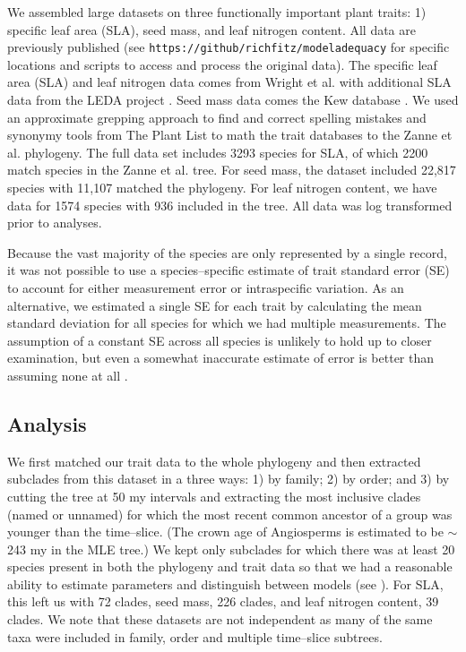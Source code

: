 \documentclass[a4paper,12pt]{article}
\begin{document}
We assembled large datasets on three functionally important plant traits: 1) specific leaf area (SLA), seed mass, and leaf nitrogen content. All data are previously published (see \texttt{https://github/richfitz/modeladequacy} for specific locations and scripts to access and process the original data). The specific leaf area (SLA) and leaf nitrogen data comes from Wright et al. \citep{Wright2004} with additional SLA data from the LEDA project \citep{Kleyer2008}. Seed mass data comes the Kew database \citep{Kew2008}. We used an approximate grepping approach to find and correct spelling mistakes and synonymy tools from The Plant List \citep{plantlist} to math the trait databases to the Zanne et al. phylogeny. 
The full data set includes 3293 species for SLA, of which 2200 match species in the Zanne et al. tree. For seed mass, the dataset included 22,817 species with 11,107 matched the phylogeny. For leaf nitrogen content, we have data for 1574 species with 936 included in the tree. All data was log transformed prior to analyses.

Because the vast majority of the species are only represented by a single
record, it was not possible to use a species--specific estimate of
trait standard error (SE) to account for either measurement error or
intraspecific variation.  As an alternative, we estimated a single SE for each trait
by calculating the mean
standard deviation for all species for which we had multiple
measurements. The assumption of a constant SE across all species is
unlikely to hold up to closer examination, but even a somewhat
inaccurate estimate of error is better than assuming none at all
\citep{Hansen2012}.

\subsection{Analysis}

We first matched our trait data to the whole phylogeny and then extracted subclades from this dataset in a three ways: 1) by family; 2) by order; and 3) by cutting the tree at 50 my intervals and extracting the most inclusive clades (named or unnamed) for which the most recent common ancestor of a group was younger than the time--slice. 
(The crown age of Angiosperms is estimated to be $\sim$243 my in the MLE tree.) We kept only subclades for which there was at least 20 species present in both the phylogeny and trait data so that we had a reasonable ability to estimate parameters and distinguish between models (see \citep{Boettiger2012, SlaterPennell}). 
For SLA, this left us with 72 clades, seed mass, 226 clades, and leaf nitrogen content, 39 clades. We note that these datasets are not independent as many of the same taxa were included in family, order and multiple time--slice subtrees. 
\end{document}
